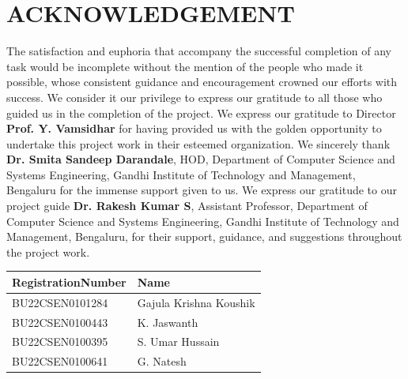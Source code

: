 \documentclass[12pt,a4paper]{report}
\begin{document}
\chapter*{ACKNOWLEDGEMENT}
The satisfaction and euphoria that accompany the successful completion of any task would be incomplete without the mention of the people who made it possible, whose consistent guidance and encouragement crowned our efforts with success. We consider it our privilege to express our gratitude to all those who guided us in the completion of the project. We express our gratitude to Director \textbf{Prof. Y. Vamsidhar} for having provided us with the golden opportunity to undertake this project work in their esteemed organization. We sincerely thank \textbf{Dr. Smita Sandeep Darandale}, HOD, Department of Computer Science and Systems Engineering, Gandhi Institute of Technology and Management, Bengaluru for the immense support given to us. We express our gratitude to our project guide \textbf{Dr. Rakesh Kumar S}, Assistant Professor, Department of Computer Science and Systems Engineering, Gandhi Institute of Technology and Management, Bengaluru, for their support, guidance, and suggestions throughout the project work.
\begin{table}[h!]
    \centering
    \renewcommand{\arraystretch}{1.4}
    \begin{tabularx}{\textwidth}{|p{4.2cm}|X|}
        \hline
        \textbf{RegistrationNumber} & \textbf{Name} \\
        \hline
        BU22CSEN0101284 & Gajula Krishna Koushik \\
        \hline
        BU22CSEN0100443 & K. Jaswanth \\
        \hline
        BU22CSEN0100395 & S. Umar Hussain \\
        \hline
        BU22CSEN0100641 & G. Natesh \\
        \hline
    \end{tabularx}
\end{table}
\end{document}
